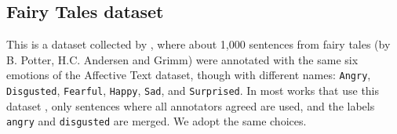 \documentclass[11pt]{article}
\newcommand{\note}[1]{\textbf{*** #1 ***}}
\begin{document}
%




\subsection{Fairy Tales dataset}
This is a dataset collected by , where about 1,000 sentences from fairy tales (by B. Potter, H.C. Andersen and Grimm) were annotated with the same six emotions of the Affective Text dataset, though with different names: \texttt{Angry}, \texttt{Disgusted}, \texttt{Fearful}, \texttt{Happy}, \texttt{Sad}, and \texttt{Surprised}. In most works that use this dataset \cite{kim2010evaluation,calvo2013emotions,chaffar2011using}, only sentences where all annotators agreed are used, and the labels \texttt{angry} and \texttt{disgusted} are merged. We adopt the same choices. 



 


\end{document}
